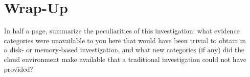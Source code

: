 \section{Wrap-Up}

\begin{questionbox}
In half a page, summarize the peculiarities of this investigation:
what evidence categories were unavailable to you here that would have been trivial to obtain in
a disk- or memory-based investigation, and what new categories (if any) did the cloud
environment make available that a traditional investigation could not have provided?
\end{questionbox}

\begin{answerbox}
\vspace{6cm}
\end{answerbox}
